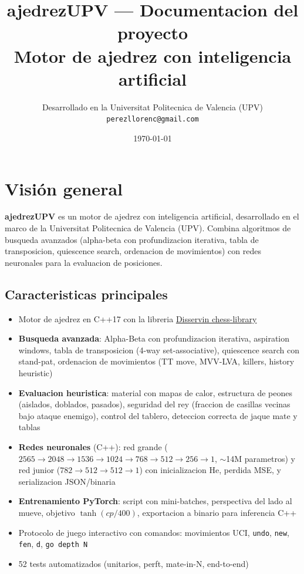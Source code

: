 \documentclass[11pt,a4paper]{article}
\title{\textbf{ajedrezUPV --- Documentacion del proyecto}\\[0.5cm]
\large Motor de ajedrez con inteligencia artificial}
\author{Desarrollado en la Universitat Politecnica de Valencia (UPV)\\
\texttt{perezllorenc@gmail.com}}
\date{\today}
\begin{document}
\maketitle
\tableofcontents
\newpage

\section{Visión general}

\textbf{ajedrezUPV} es un motor de ajedrez con inteligencia artificial,
desarrollado en el marco de la Universitat Politecnica de Valencia (UPV).
Combina algoritmos de busqueda avanzados (alpha-beta con profundizacion
iterativa, tabla de transposicion, quiescence search, ordenacion de
movimientos) con redes neuronales para la evaluacion de posiciones.

\subsection*{Caracteristicas principales}
\begin{itemize}
  \item Motor de ajedrez en C++17 con la libreria
        \href{https://disservin.github.io/chess-library/}{Disservin chess-library}
  \item \textbf{Busqueda avanzada}: Alpha-Beta con profundizacion iterativa,
        aspiration windows, tabla de transposicion (4-way set-associative),
        quiescence search con stand-pat, ordenacion de movimientos (TT move,
        MVV-LVA, killers, history heuristic)
  \item \textbf{Evaluacion heuristica}: material con mapas de calor,
        estructura de peones (aislados, doblados, pasados), seguridad del rey
        (fraccion de casillas vecinas bajo ataque enemigo), control del
        tablero, deteccion correcta de jaque mate y tablas
  \item \textbf{Redes neuronales} (C++): red grande
        ($2565 \to 2048 \to 1536 \to 1024 \to 768 \to 512 \to 256 \to 1$,
        $\sim$14M parametros) y red junior ($782 \to 512 \to 512 \to 1$)
        con inicializacion He, perdida MSE, y serializacion JSON/binaria
  \item \textbf{Entrenamiento PyTorch}: script con mini-batches, perspectiva
        del lado al mueve, objetivo $\tanh(cp/400)$, exportacion a binario
        para inferencia C++
  \item Protocolo de juego interactivo con comandos: movimientos UCI,
        \texttt{undo}, \texttt{new}, \texttt{fen}, \texttt{d}, \texttt{go depth N}
  \item 52 tests automatizados (unitarios, perft, mate-in-N, end-to-end)
\end{itemize}
\end{document}
